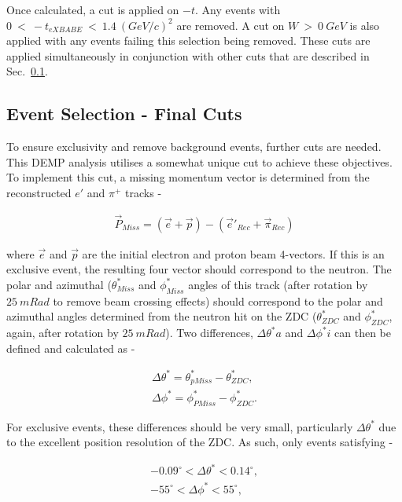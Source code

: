 \documentclass[letterpaper,12pt]{article}
\begin{document}
Once calculated, a cut is applied on $-t$. Any events with\newline $0~<~-t_{eXBABE}~<~1.4~(GeV/c)^{2}$ are removed. A cut on $W~>~0~GeV$ is also applied with any events failing this selection being removed. These cuts are applied simultaneously in conjunction with other cuts that are described in Sec.~\ref{subsec:Exclusivity_Cuts}.

\subsection{Event Selection - Final Cuts}\label{subsec:Exclusivity_Cuts}

To ensure exclusivity and remove background events, further cuts are needed. This DEMP analysis utilises a somewhat unique cut to achieve these objectives. To implement this cut, a missing momentum vector is determined from the reconstructed $e'$ and $\pi^{+}$ tracks -

\begin{gather*}
    \vec{P}_{Miss} = \left(\vec{e}+\vec{p}\right) - \left(\vec{e}\prime_{Rec} + \vec{\pi}_{Rec}\right)
\end{gather*}

where $\vec{e}$ and $\vec{p}$ are the initial electron and proton beam 4-vectors. If this is an exclusive event, the resulting four vector should correspond to the neutron. The polar and azimuthal ($\theta^{*}_{Miss}$ and $\phi^{*}_{Miss}$ angles of this track (after rotation by $25~mRad$ to remove beam crossing effects) should correspond to the polar and azimuthal angles determined from the neutron hit on the ZDC ($\theta^{*}_{ZDC}$ and $\phi^{*}_{ZDC}$, again, after rotation by $25~mRad$). Two differences, $\Delta\theta^{*}a$ and $\Delta\phi^{*}i$ can then be defined and calculated as -

\begin{gather*}
    \Delta\theta^{*} = \theta^{*}_{pMiss} - \theta^{*}_{ZDC},\\
    \Delta\phi^{*} = \phi^{*}_{PMiss} - \phi^{*}_{ZDC}.
\end{gather*}

For exclusive events, these differences should be very small, particularly $\Delta\theta^{*}$ due to the excellent position resolution of the ZDC. As such, only events satisfying -

\begin{gather*}
    -0.09^{\circ} < \Delta\theta^{*} < 0.14^{\circ},\\
    -55^{\circ}< \Delta\phi^{*} < 55^{\circ},
\end{gather*}
\end{document}
